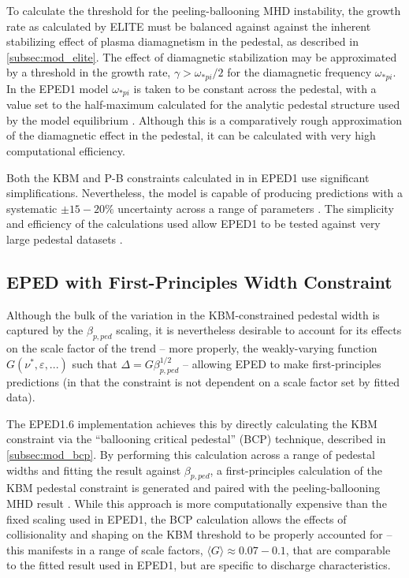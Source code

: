 To calculate the threshold for the peeling-ballooning MHD instability, the growth rate as calculated by ELITE must be balanced against against the inherent stabilizing effect of plasma diamagnetism in the pedestal, as described in \cref{subsec:mod_elite}.  The effect of diamagnetic stabilization may be approximated by a threshold in the growth rate, $\gamma > \omega_{*pi}/2$ for the diamagnetic frequency $\omega_{*pi}$.  In the EPED1 model $\omega_{*pi}$ is taken to be constant across the pedestal, with a value set to the half-maximum calculated for the analytic pedestal structure used by the model equilibrium \cite{Snyder2009}.  Although this is a comparatively rough approximation of the diamagnetic effect in the pedestal, it can be calculated with very high computational efficiency.

Both the KBM and P-B constraints calculated in in EPED1 use significant simplifications.  Nevertheless, the model is capable of producing predictions with a systematic $\pm 15-20\%$ uncertainty across a range of parameters \cite{Snyder2009,Snyder2010}.  The simplicity and efficiency of the calculations used allow EPED1 to be tested against very large pedestal datasets \cite{Snyder2011}.

\subsection{EPED with First-Principles Width Constraint}\label{subsec:mod_eped16}

Although the bulk of the variation in the KBM-constrained pedestal width is captured by the $\beta_{p,ped}$ scaling, it is nevertheless desirable to account for its effects on the scale factor of the trend -- more properly, the weakly-varying function $G(\nu^*,\varepsilon,...)$ such that $\Delta = G \beta_{p,ped}^{1/2}$ -- allowing EPED to make first-principles predictions (in that the constraint is not dependent on a scale factor set by fitted data).  

The EPED1.6 implementation \cite{Snyder2010,Snyder2011} achieves this by directly calculating the KBM constraint via the ``ballooning critical pedestal'' (BCP) technique, described in \cref{subsec:mod_bcp}.    By performing this calculation across a range of pedestal widths and fitting the result against $\beta_{p,ped}$, a first-principles calculation of the KBM pedestal constraint is generated and paired with the peeling-ballooning MHD result \cite{Snyder2011}.  While this approach is more computationally expensive than the fixed scaling used in EPED1, the BCP calculation allows the effects of collisionality and shaping on the KBM threshold to be properly accounted for -- this manifests in a range of scale factors, $\langle G \rangle \approx 0.07-0.1$, that are comparable to the fitted result used in EPED1, but are specific to discharge characteristics.

